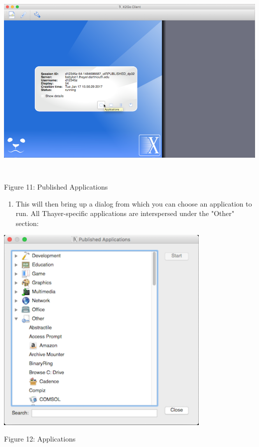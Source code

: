\documentclass{article}
\begin{document}
\includegraphics[width=6.26806in,height=3.83718in]{images/media/image11.png}

Figure 11: Published Applications

\begin{enumerate}
\def\labelenumi{\arabic{enumi}.}
\setcounter{enumi}{17}
\item
  This will then bring up a dialog from which you can choose an
  application to run. All Thayer-specific applications are interspersed
  under the "Other" section:
\end{enumerate}

\includegraphics[width=4.07153in,height=3.96413in]{images/media/image12.png}

Figure 12: Applications
\end{document}
